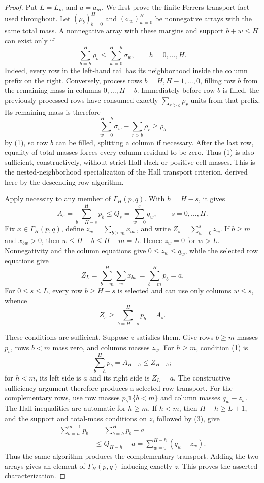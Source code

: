 \documentclass{article}
\begin{document}
\begin{proof}
Put \(L=L_m\) and \(a=a_m\).  We first prove the finite Ferrers transport fact used throughout.  Let \((\rho_b)_{b=0}^H\) and \((\sigma_w)_{w=0}^H\) be nonnegative arrays with the same total mass.  A nonnegative array with these margins and support \(b+w\le H\) can exist only if
\[
 \sum_{b=h}^H\rho_b\le \sum_{w=0}^{H-h}\sigma_w,
 \qquad h=0,\ldots,H.                                      \tag{1}
\]
Indeed, every row in the left-hand tail has its neighborhood inside the column prefix on the right.  Conversely, process rows \(b=H,H-1,\ldots,0\), filling row \(b\) from the remaining mass in columns \(0,\ldots,H-b\).  Immediately before row \(b\) is filled, the previously processed rows have consumed exactly \(\sum_{r>b}\rho_r\) units from that prefix.  Its remaining mass is therefore
\[
 \sum_{w=0}^{H-b}\sigma_w-\sum_{r>b}\rho_r\ge \rho_b       \tag{2}
\]
by (1), so row \(b\) can be filled, splitting a column if necessary.  After the last row, equality of total masses forces every column residual to be zero.  Thus (1) is also sufficient, constructively, without strict Hall slack or positive cell masses.  This is the nested-neighborhood specialization of the Hall transport criterion, derived here by the descending-row algorithm.

Apply necessity to any member of \(\Gamma_H(p,q)\).  With \(h=H-s\), it gives
\[
 A_s=\sum_{b=H-s}^Hp_b\le Q_s=\sum_{w=0}^sq_w,
 \qquad s=0,\ldots,H.                                      \tag{3}
\]
Fix \(x\in\Gamma_H(p,q)\), define \(z_w=\sum_{b\ge m}x_{bw}\), and write \(Z_s=\sum_{w=0}^sz_w\).  If \(b\ge m\) and \(x_{bw}>0\), then \(w\le H-b\le H-m=L\).  Hence \(z_w=0\) for \(w>L\).  Nonnegativity and the column equations give \(0\le z_w\le q_w\), while the selected row equations give
\[
 Z_L=\sum_{b=m}^H\sum_wx_{bw}=\sum_{b=m}^Hp_b=a.            \tag{4}
\]
For \(0\le s\le L\), every row \(b\ge H-s\) is selected and can use only columns \(w\le s\), whence
\[
 Z_s\ge \sum_{b=H-s}^Hp_b=A_s.                             \tag{5}
\]

These conditions are sufficient.  Suppose \(z\) satisfies them.  Give rows \(b\ge m\) masses \(p_b\), rows \(b<m\) mass zero, and columns masses \(z_w\).  For \(h\ge m\), condition (1) is
\[
 \sum_{b=h}^Hp_b=A_{H-h}\le Z_{H-h};                       \tag{6}
\]
for \(h<m\), its left side is \(a\) and its right side is \(Z_L=a\).  The constructive sufficiency argument therefore produces a selected-row transport.  For the complementary rows, use row masses \(p_b\mathbf 1\{b<m\}\) and column masses \(q_w-z_w\).  The Hall inequalities are automatic for \(h\ge m\).  If \(h<m\), then \(H-h\ge L+1\), and the support and total-mass conditions on \(z\), followed by (3), give
\[
 \begin{aligned}
 \sum_{b=h}^{m-1}p_b
 &=\sum_{b=h}^Hp_b-a\\
 &\le Q_{H-h}-a
 =\sum_{w=0}^{H-h}(q_w-z_w).
 \end{aligned}                                             \tag{7}
\]
Thus the same algorithm produces the complementary transport.  Adding the two arrays gives an element of \(\Gamma_H(p,q)\) inducing exactly \(z\).  This proves the asserted characterization.


\end{proof}
\end{document}
